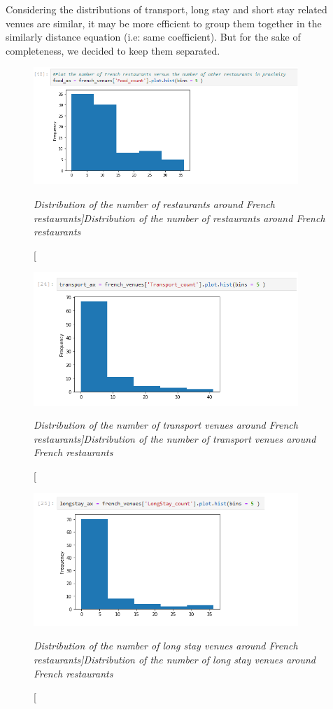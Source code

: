 \documentclass[12pt,a4paper]{article}
\begin{document}
Considering the distributions of transport, long stay and short stay related venues are similar, it may be more efficient to group them together in the similarly distance equation (i.e: same coefficient). But for the sake of completeness, we decided to keep them separated. 

\begin{figure}[ht]
	\begin{center}
			  \includegraphics[width=10cm]{hist_food.png}
	\end{center}
	\caption [\itshape Distribution of the number of restaurants around French restaurants]{\itshape Distribution of the number of restaurants around French restaurants}	
	\label{hist_food}
\end{figure}

\begin{figure}[ht]
	\begin{center}
			  \includegraphics[width=10cm]{hist_transport.png}
	\end{center}
	\caption [\itshape Distribution of the number of transport venues around French restaurants]{\itshape Distribution of the number of transport venues around French restaurants}	
	\label{hist_transport}
\end{figure}

\begin{figure}[ht]
	\begin{center}
			  \includegraphics[width=10cm]{hist_longstay.png}
	\end{center}
	\caption [\itshape Distribution of the number of long stay venues around French restaurants]{\itshape Distribution of the number of long stay venues around French restaurants}	
	\label{hist_longstay}
\end{figure}
\end{document}
